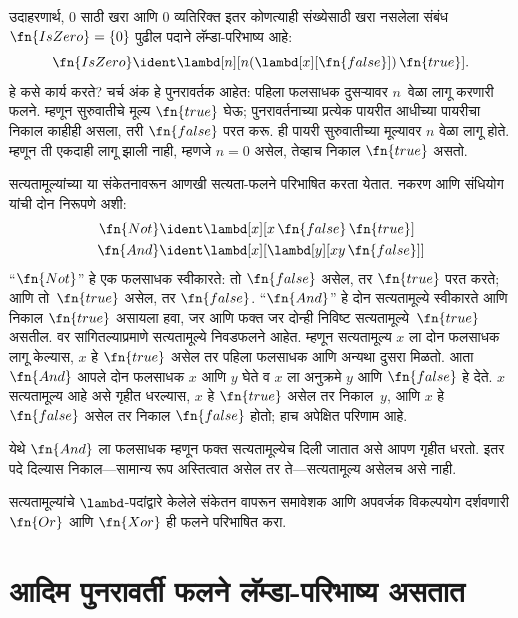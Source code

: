 उदाहरणार्थ, $0$ साठी खरा आणि $0$ व्यतिरिक्त इतर
कोणत्याही संख्येसाठी खरा नसलेला संबंध
$\fn{IsZero} = \{0\}$ पुढील पदाने
लॅम्डा-परिभाष्य आहे:
\[  \fn{IsZero} \ident \lambd[n][n (\lambd[x][\fn{false}])\, \fn{true}].
\]
हे कसे कार्य करते? चर्च अंक हे पुनरावर्तक आहेत:
पहिला फलसाधक दुसऱ्यावर $n$~वेळा लागू करणारी
फलने. म्हणून सुरुवातीचे मूल्य $\fn{true}$ घेऊ;
पुनरावर्तनाच्या प्रत्येक पायरीत आधीच्या पायरीचा
निकाल काहीही असला, तरी $\fn{false}$ परत करू.
ही पायरी सुरुवातीच्या मूल्यावर $n$ वेळा लागू होते.
म्हणून ती एकदाही लागू झाली नाही, म्हणजे $n = 0$
असेल, तेव्हाच निकाल $\fn{true}$ असतो.

सत्यतामूल्यांच्या या संकेतनावरून आणखी सत्यता-फलने
परिभाषित करता येतात. नकरण आणि संधियोग यांची
दोन निरूपणे अशी:
\begin{align*}
  \fn{Not} & \ident \lambd[x][x\, \fn{false}\, \fn{true}]\\
  \fn{And} & \ident \lambd[x][\lambd[y][xy \,\fn{false}]]
\end{align*}
``$\fn{Not}$'' हे एक फलसाधक स्वीकारते:
तो $\fn{false}$ असेल, तर $\fn{true}$ परत करते;
आणि तो~$\fn{true}$ असेल, तर $\fn{false}$.
``$\fn{And}$'' हे दोन सत्यतामूल्ये स्वीकारते आणि
निकाल $\fn{true}$ असायला हवा, जर आणि फक्त जर
दोन्ही निविष्ट सत्यतामूल्ये~$\fn{true}$ असतील. वर सांगितल्याप्रमाणे सत्यतामूल्ये
निवडफलने आहेत. म्हणून सत्यतामूल्य $x$ ला दोन
फलसाधक लागू केल्यास, $x$ हे $\fn{true}$ असेल
तर पहिला फलसाधक आणि अन्यथा दुसरा मिळतो.
आता $\fn{And}$ आपले दोन फलसाधक $x$ आणि $y$
घेते व $x$ ला अनुक्रमे $y$ आणि $\fn{false}$
हे देते. $x$ सत्यतामूल्य आहे असे गृहीत धरल्यास,
$x$ हे $\fn{true}$ असेल तर निकाल~$y$,
आणि $x$ हे $\fn{false}$ असेल तर निकाल
$\fn{false}$ होतो; हाच अपेक्षित परिणाम आहे.

येथे $\fn{And}$ ला फलसाधक म्हणून फक्त
सत्यतामूल्येच दिली जातात असे आपण गृहीत धरतो.
इतर पदे दिल्यास निकाल—सामान्य रूप अस्तित्वात
असेल तर ते—सत्यतामूल्य असेलच असे नाही.

\begin{prob}
  सत्यतामूल्यांचे $\lambd$-पदांद्वारे केलेले संकेतन
  वापरून समावेशक आणि अपवर्जक विकल्पयोग दर्शवणारी
  $\fn{Or}$ आणि $\fn{Xor}$ ही फलने परिभाषित करा.
\end{prob}











\section{आदिम पुनरावर्ती फलने लॅम्डा-परिभाष्य असतात}\label{lam:ldf:prf:sec}

